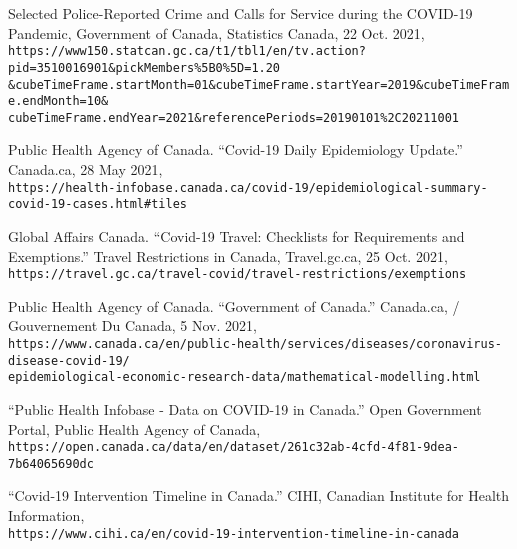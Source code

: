 \documentclass[fontsize=11pt]{article}
\newcommand{\quotes}[1]{``#1''}
\begin{document}
\begin{thebibliography}{9}
	Selected Police-Reported Crime and Calls for Service during the COVID-19 Pandemic, Government of Canada, Statistics Canada, 22 Oct. 2021, \\
	\verb+https://www150.statcan.gc.ca/t1/tbl1/en/tv.action?pid=3510016901&pickMembers%5B0%5D=1.20+\\
	\verb+&cubeTimeFrame.startMonth=01&cubeTimeFrame.startYear=2019&cubeTimeFrame.endMonth=10&+\\
	\verb+cubeTimeFrame.endYear=2021&referencePeriods=20190101%2C20211001+
	
	Public Health Agency of Canada. \quotes{Covid-19 Daily Epidemiology Update.} Canada.ca, 28 May 2021,\\
	\verb+https://health-infobase.canada.ca/covid-19/epidemiological-summary-covid-19-cases.html#tiles+
	
	Global Affairs Canada. \quotes{Covid-19 Travel: Checklists for Requirements and Exemptions.} Travel Restrictions in Canada,  Travel.gc.ca, 25 Oct. 2021,\\
	\verb+https://travel.gc.ca/travel-covid/travel-restrictions/exemptions+
	
	Public Health Agency of Canada. \quotes{Government of Canada.} Canada.ca, / Gouvernement Du Canada, 5 Nov. 2021,\\
	\verb+https://www.canada.ca/en/public-health/services/diseases/coronavirus-disease-covid-19/+\\
	\verb+epidemiological-economic-research-data/mathematical-modelling.html+
	
	\quotes{Public Health Infobase - Data on COVID-19 in Canada.} Open Government Portal, Public Health Agency of Canada,\\
	\verb+https://open.canada.ca/data/en/dataset/261c32ab-4cfd-4f81-9dea-7b64065690dc+
	
	\quotes{Covid-19 Intervention Timeline in Canada.} CIHI, Canadian Institute for Health Information,\\
	\verb+https://www.cihi.ca/en/covid-19-intervention-timeline-in-canada+
	
	
	
\end{thebibliography}
\end{document}
